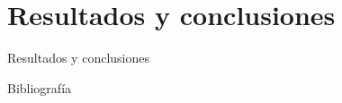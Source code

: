 \documentclass{beamer}
\begin{document}
  \section{Resultados y conclusiones}

  \begin{frame}{Resultados y conclusiones}
    
  \end{frame}

  \begin{frame}[allowframebreaks]{Bibliografía}
    \printbibliography
  \end{frame}

  \setlength{\parskip}{0.0em}

  {
  \frame{\titlepage}}
\end{document}
